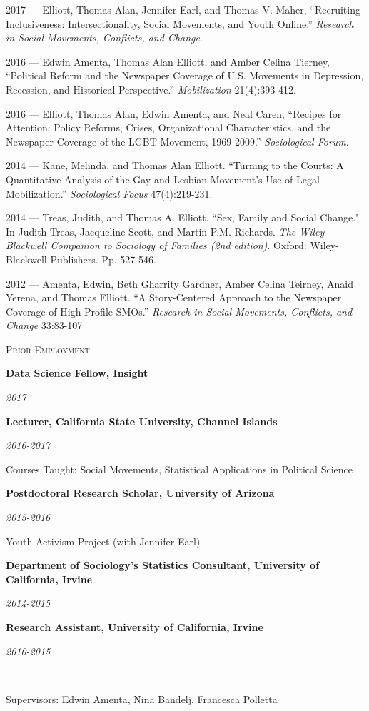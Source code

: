 \documentclass[11pt]{article}
\newcommand{\sectionheader}[1]{
{\Large
\textsc{#1}}
}
\newcommand{\resumeitem}[2]{
\begin{minipage}{0.7\textwidth}
\begin{flushleft}
\textbf{#1}
\end{flushleft}
\end{minipage}
\begin{minipage}{0.3\textwidth}
\begin{flushright}
\emph{#2}
\end{flushright}
\end{minipage}
\hangindent=0.05\textwidth
}
\newcommand{\resumesubitem}[2]{
\begin{minipage}{0.65\textwidth}
\begin{flushleft}
#1
\end{flushleft}
\end{minipage}
\begin{minipage}{0.3\textwidth}
\begin{flushright}
#2
\end{flushright}
\end{minipage}
\hangindent=0.05\textwidth
}
\begin{document}
2017 --- Elliott, Thomas Alan, Jennifer Earl, and Thomas V. Maher, ``Recruiting Inclusiveness: Intersectionality, Social Movements, and Youth Online.'' \textit{Research in Social Movements, Conflicts, and Change}.

2016 --- Edwin Amenta, Thomas Alan Elliott, and Amber Celina Tierney, ``Political Reform and the Newspaper Coverage of U.S. Movements in Depression, Recession, and Historical Perspective.'' \textit{Mobilization} 21(4):393-412.

2016 --- Elliott, Thomas Alan, Edwin Amenta, and Neal Caren, ``Recipes for Attention: Policy Reforms, Crises, Organizational Characteristics, and the Newspaper Coverage of the LGBT Movement, 1969-2009.'' \textit{Sociological Forum}. 

2014 --- Kane, Melinda, and Thomas Alan Elliott. ``Turning to the Courts: A Quantitative Analysis of the Gay and Lesbian Movement's Use of Legal Mobilization.'' \textit{Sociological Focus} 47(4):219-231.

2014 --- Treas, Judith, and Thomas A. Elliott. ``Sex, Family and Social Change." In Judith Treas, Jacqueline Scott, and Martin P.M. Richards. \textit{The Wiley-Blackwell Companion to Sociology of Families (2nd edition)}. Oxford: Wiley-Blackwell Publishers. Pp. 527-546.

2012 --- Amenta, Edwin, Beth Gharrity Gardner, Amber Celina Teirney, Anaid Yerena, and Thomas Elliott. ``A Story-Centered Approach to the Newspaper Coverage of High-Profile SMOs.'' \textit{Research in Social Movements, Conflicts, and Change} 33:83-107





\sectionheader{Prior Employment}

\resumeitem{Data Science Fellow, Insight}{2017}

\resumeitem{Lecturer, California State University, Channel Islands}{2016-2017}
\resumesubitem{Courses Taught: Social Movements, Statistical Applications in Political Science}{}

\resumeitem{Postdoctoral Research Scholar, University of Arizona}{2015-2016}
\resumesubitem{Youth Activism Project (with Jennifer Earl)}{}

\resumeitem{Department of Sociology's Statistics Consultant, University of California, Irvine}{2014-2015}

\resumeitem{Research Assistant, University of California, Irvine}{2010-2015}\\
\resumesubitem{Supervisors: Edwin Amenta, Nina Bandelj, Francesca Polletta}{}
\end{document}
